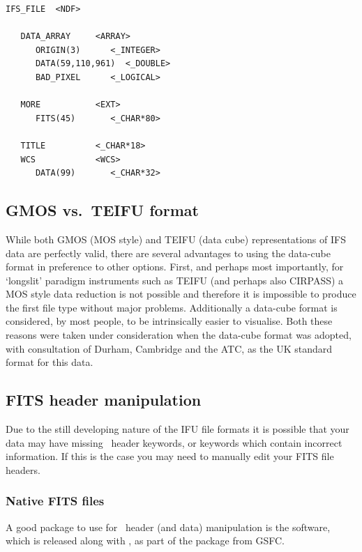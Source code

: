 \documentclass[twoside,11pt]{article}
\newcommand{\htmladdnormallink}[2]{#1}
\newcommand{\xlabel}[1]{}
\begin{document}
\small\begin{verbatim}
IFS_FILE  <NDF>

   DATA_ARRAY     <ARRAY>
      ORIGIN(3)      <_INTEGER>
      DATA(59,110,961)  <_DOUBLE>
      BAD_PIXEL      <_LOGICAL>  

   MORE           <EXT>
      FITS(45)       <_CHAR*80>

   TITLE          <_CHAR*18> 
   WCS            <WCS>      
      DATA(99)       <_CHAR*32>
\end{verbatim}\normalsize

\subsection{\xlabel{sc16_fits2ndf}GMOS vs.\ TEIFU format\label{sc16_fits2ndf}}

While both GMOS (MOS style) and TEIFU (data cube) representations of
IFS data are perfectly valid, there are several advantages to using the
data-cube format in preference to other options.  First, and perhaps
most importantly, for `longslit' paradigm instruments such as TEIFU
(and perhaps also CIRPASS) a MOS style data reduction is not possible
and therefore it is impossible to produce the first file type without
major problems.  Additionally a data-cube format is considered, by most
people, to be intrinsically easier to visualise.  Both these reasons
were taken under consideration when the data-cube format was adopted,
with consultation of Durham, Cambridge and the ATC, as the UK standard
format for this data.

\subsection{\xlabel{sc16_fitshdr}FITS header manipulation\label{sc16_fitshdr}}

Due to the still developing nature of the IFU file formats it is
possible that your data may have missing \FITSref\  header keywords, or
keywords which contain incorrect information.  If this is the case you
may need to manually edit your FITS file headers.

\subsubsection{Native FITS files}
 
A good package to use for \FITSref\ header (and data) manipulation is the
\htmladdnormallink{\FTOOLS}{
http://heasarc.gsfc.nasa.gov/docs/software/lheasoft/ftools/} software,
which is released along with
\htmladdnormallink{\XANADU}{http://heasarc.gsfc.nasa.gov/docs/software/lheasoft/xanadu/},
as part of the
\htmladdnormallink{\HEASOFT}{http://heasarc.gsfc.nasa.gov/docs/software/lheasoft/}
package from GSFC.
\end{document}
